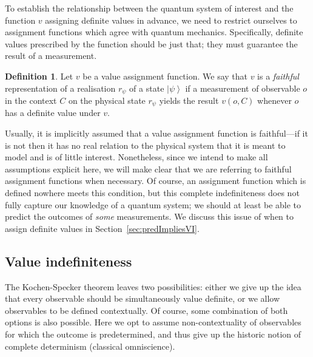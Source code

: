 \documentclass[%
 preprint,
 showpacs,
 showkeys,
 amsmath,
 amssymb,
 aps,
 pra,
 ]{revtex4-1}
\theoremstyle{definition}
\newtheorem{Definition}[Theorem]{Definition}
\newcommand{\ket}[1]{\left| #1 \right>}
\begin{document}
To establish the relationship between the quantum system of interest and the function $v$ assigning definite values in advance, we need to restrict ourselves to assignment functions which agree with quantum mechanics.
Specifically, definite values prescribed by the function should be just that; they must guarantee the result of a measurement.\\
\begin{Definition}
	Let $v$ be a value assignment function. We say that $v$ is a \emph{faithful} representation of a realisation $r_\psi$ of a state $\ket{\psi}$ if a measurement of observable $o$ in the context $C$ on the physical state $r_\psi$ yields the result $v(o,C)$ whenever $o$ has a definite value under $v$.
\end{Definition}
Usually, it is implicitly assumed that a value assignment function is faithful---if it is not then it has no real relation to the physical system that it is meant to model and is of little interest.
Nonetheless, since we intend to make all assumptions explicit here, we will make clear that we are referring to faithful assignment functions when necessary.
Of course, an assignment function which is defined nowhere meets this condition, but this complete indefiniteness does not fully capture our knowledge of a quantum system; we should at least be able to predict the outcomes of \emph{some} measurements.
We discuss this issue of when to assign definite values in Section~\ref{sec:predImpliesVI}.


\subsection{Value indefiniteness}

The Kochen-Specker theorem leaves two possibilities: either we give up the idea that every observable should be simultaneously value definite, or we allow observables to be defined contextually. Of course, some combination of both options is also possible.
Here we opt to assume non-contextuality of observables for which the outcome is predetermined, and thus give up the historic notion of complete determinism (classical omniscience).
\end{document}
